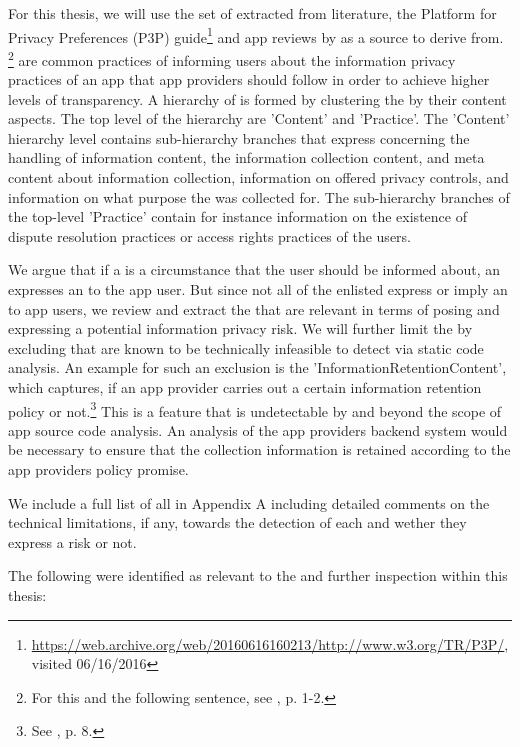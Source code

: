 For this thesis, we will use the set of \ipp extracted from literature, the Platform for Privacy Preferences (\acs{P3P}) guide\footnote{\url{https://web.archive.org/web/20160616160213/http://www.w3.org/TR/P3P/}, visited 06/16/2016} and app reviews by \cite{Dehling2016} as a source to derive \iprfs from. \footnote{For this and the following sentence, see \cite{Dehling2016}, p. 1-2.} 
\Ipp are common practices of informing users about the information privacy practices of an app that app providers should follow in order to achieve higher levels of transparency.
A hierarchy of \ipp is formed by clustering the \ipp by their content aspects. 
The top level of the hierarchy are 'Content' and 'Practice'.
The 'Content' hierarchy level contains sub-hierarchy branches that express \ipp concerning the handling of information content, the information collection content, and meta content about information collection, information on offered privacy controls, and information on what purpose the \ipp was collected for.
The sub-hierarchy branches of the top-level 'Practice' contain for instance information on the existence of dispute resolution practices or access rights practices of the users.

We argue that if a \ipp is a circumstance that the user should be informed about, an \ipp expresses an \ipr to the app user.
But since not all of the enlisted \ipp express or imply an \ipr to app users, we review and extract the \ipp that are relevant in terms of posing and expressing a potential information privacy risk.
We will further limit the \ipp by excluding \ipp that are known to be technically infeasible to detect via static code analysis.
An example for such an exclusion is the \ipp 'InformationRetentionContent', which captures, if an app provider carries out a certain information retention policy or not.\footnote{See \cite{Dehling2016}, p. 8.}
This is a feature that is undetectable by \sca and beyond the scope of app source code analysis.
An analysis of the app providers backend system would be necessary to ensure that the collection information is retained according to the app providers policy promise.

We include a full list of all \ipp in Appendix A including detailed comments on the technical limitations, if any, towards the \sca detection of each \ipp and wether they express a risk or not.

The following \ipp were identified as relevant to the \sca and further inspection within this thesis:

